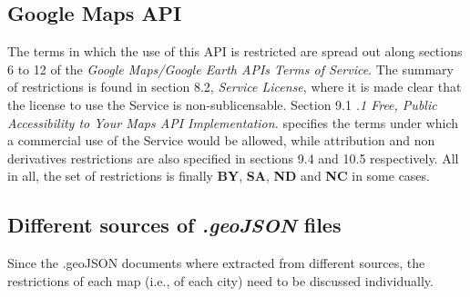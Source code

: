 \subsection{Google Maps API}

The terms in which the use of this API is restricted are spread out along sections 6 to 12 of the \textit{Google Maps/Google Earth APIs Terms of Service}. The summary of restrictions is found in section 8.2, \textit{Service License}, where it is made clear that the license to use the Service is non-sublicensable. Section 9.1 \textit{.1 Free, Public Accessibility to Your Maps API Implementation.} specifies the terms under which a commercial use of the Service would be allowed, while attribution and non derivatives restrictions are also specified in sections 9.4 and 10.5 respectively. All in all, the set of restrictions is finally  \textbf{BY}, \textbf{SA}, \textbf{ND} and \textbf{NC} in some cases.

\subsection{Different sources of \textit{.geoJSON} files}

Since the .geoJSON documents where extracted from different sources, the restrictions of each map (i.e., of each city) need to be discussed individually. 

